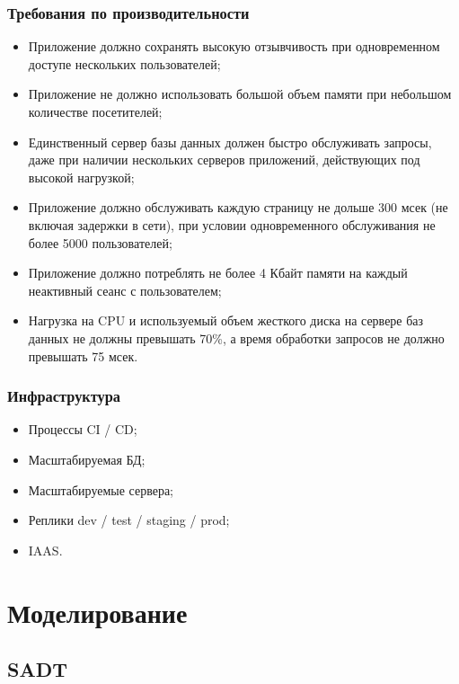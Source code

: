 \documentclass[a4paper,8pt]{article}
\begin{document}
\subsubsection{Требования по производительности}

    \begin{itemize}
        \item Приложение должно сохранять высокую отзывчивость при одновременном доступе нескольких пользователей;
        \item Приложение не должно использовать большой объем памяти при небольшом количестве посетителей;
        \item Единственный сервер базы данных должен быстро обслуживать запросы, даже при наличии нескольких серверов приложений, действующих под высокой нагрузкой;
        \item Приложение должно обслуживать каждую страницу не дольше 300 мсек (не включая задержки в сети), при условии одновременного обслуживания не более 5000 пользователей;
        \item Приложение должно потреблять не более 4 Кбайт памяти на каждый неактивный сеанс с пользователем;
        \item Нагрузка на CPU и используемый объем жесткого диска на сервере баз данных не должны превышать 70\%, а время обработки запросов не должно превышать 75 мсек.

    \end{itemize}


\subsubsection{Инфраструктура}

    \begin{itemize}
        \item Процессы CI / CD;
        \item Масштабируемая БД;
        \item Масштабируемые сервера;
        \item Реплики dev / test / staging / prod;
        \item IAAS.
    \end{itemize}


\newpage
\section{Моделирование}


\subsection{SADT}
\end{document}
